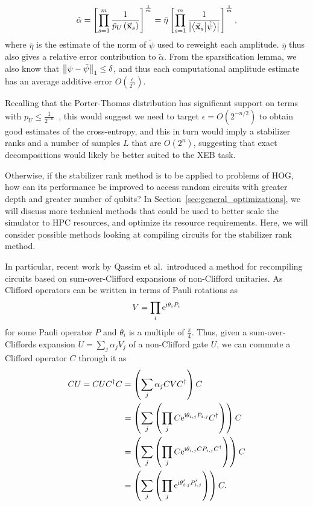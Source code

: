 \[\tilde{\alpha} = \left[\prod_{s=1}^{m} \frac{1}{\tilde{p}_{U}\left(\va{x}_{s}\right)} \right]^{\frac{1}{m}} = \bar{\eta}\left[\prod_{s=1}^{m} \frac{1}{\left|\braket{\va{x}_{s}}{\tilde{\psi}}\right|} \right]^{\frac{1}{m}},\]
where $\bar{\eta}$ is the estimate of the norm of $\tilde{\psi}$ used to reweight each amplitude. $\bar{\eta}$ thus also gives a relative error contribution to $\tilde{\alpha}$. From the sparsification lemma, we also know that $\norm{\psi-\tilde{\psi}}_{1}\leq \delta$, and thus each computational amplitude estimate has an average additive error $O(\frac{\epsilon}{2^{n}})$.\par
Recalling that the Porter-Thomas distribution has significant support on terms with $p_{U}\leq \frac{1}{2^{-n}}$~\cite{Boixo2016}, this would suggest we need to target $\epsilon = O\left(2^{-n/2}\right)$ to obtain good  estimates of the cross-entropy, and this in turn would imply a stabilizer ranks and a number of samples $L$ that are $O(2^{n})$, suggesting that exact decompositions would likely be better suited to the XEB task.\par
Otherwise, if the stabilizer rank method is to be applied to problems of HOG, how can its performance be improved to access random circuits with greater depth and greater number of qubits? In Section~\ref{sec:general_optimizations}, we will discuss more technical methods that could be used to better scale the simulator to HPC resources, and optimize its resource requirements. Here, we will consider possible methods looking at compiling circuits for the stabilizer rank method.\par
In particular, recent work by Qassim et al.\ introduced a method for recompiling circuits based on sum-over-Clifford expansions of non-Clifford unitaries. As Clifford operators can be written in terms of Pauli rotations as
\[V=\prod_{i} \mathrm{e}^{\mathrm{i} \theta_{i} P_{i}}\]
for some Pauli operator $P$ and $\theta_{i}$ is a multiple of $\frac{\pi}{4}$. Thus, given a sum-over-Cliffords expansion $U=\sum_{j}\alpha_{j}V_{j}$ of a non-Clifford gate $U$, we can commute a Clifford operator $C$ through it as~\cite{Qassim2019}
\begin{align}
C U = CUC^{\dagger} C &= \left(\sum_{j}\alpha_{j}CVC^{\dagger}\right)C \nonumber \\
&= \left(\sum_{j}\left(\prod_{j} C\mathrm{e}^{\mathrm{i}\theta_{i,j}P_{i,j}}C^{\dagger} \right)\right)C\nonumber\\
&= \left(\sum_{j}\left(\prod_{j} C\mathrm{e}^{\mathrm{i}\theta_{i,j}CP_{i,j}C^{\dagger}} \right)\right)C \nonumber \\
&= \left(\sum_{j}\left(\prod_{j} \mathrm{e}^{\mathrm{i}\theta'_{i,j}P'_{i,j}} \right)\right)C.
\end{align}
